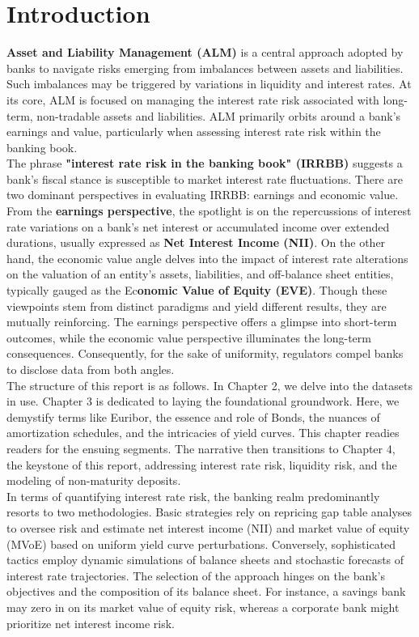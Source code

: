\documentclass[11pt]{report}
\begin{document}
\chapter{Introduction}

\textbf{Asset and Liability Management (ALM)} is a central approach adopted by banks to navigate risks emerging from imbalances between assets and liabilities. Such imbalances may be triggered by variations in liquidity and interest rates. At its core, ALM is focused on managing the interest rate risk associated with long-term, non-tradable assets and liabilities. ALM primarily orbits around a bank's earnings and value, particularly when assessing interest rate risk within the banking book.\\

The phrase \textbf{"interest rate risk in the banking book" (IRRBB)} suggests a bank's fiscal stance is susceptible to market interest rate fluctuations. There are two dominant perspectives in evaluating IRRBB: earnings and economic value. From the \textbf{earnings perspective}, the spotlight is on the repercussions of interest rate variations on a bank's net interest or accumulated income over extended durations, usually expressed as \textbf{Net Interest Income (NII)}. On the other hand, the economic value angle delves into the impact of interest rate alterations on the valuation of an entity's assets, liabilities, and off-balance sheet entities, typically gauged as the Ec\textbf{onomic Value of Equity (EVE)}. Though these viewpoints stem from distinct paradigms and yield different results, they are mutually reinforcing. The earnings perspective offers a glimpse into short-term outcomes, while the economic value perspective illuminates the long-term consequences. Consequently, for the sake of uniformity, regulators compel banks to disclose data from both angles.\\

The structure of this report is as follows. In Chapter 2, we delve into the datasets in use. Chapter 3 is dedicated to laying the foundational groundwork. Here, we demystify terms like Euribor, the essence and role of Bonds, the nuances of amortization schedules, and the intricacies of yield curves. This chapter readies readers for the ensuing segments. The narrative then transitions to Chapter 4, the keystone of this report, addressing interest rate risk, liquidity risk, and the modeling of non-maturity deposits.\\

In terms of quantifying interest rate risk, the banking realm predominantly resorts to two methodologies. Basic strategies rely on repricing gap table analyses to oversee risk and estimate net interest income (NII) and market value of equity (MVoE) based on uniform yield curve perturbations. Conversely, sophisticated tactics employ dynamic simulations of balance sheets and stochastic forecasts of interest rate trajectories. The selection of the approach hinges on the bank's objectives and the composition of its balance sheet. For instance, a savings bank may zero in on its market value of equity risk, whereas a corporate bank might prioritize net interest income risk.\\
\end{document}
